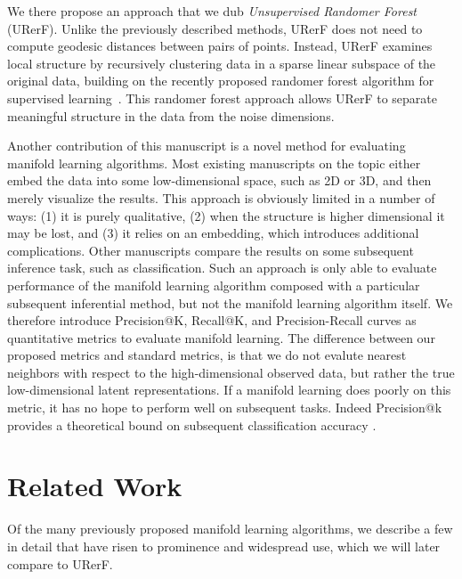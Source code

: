 We there propose an approach that we dub \emph{Unsupervised Randomer Forest} (URerF).
Unlike the previously described methods,
URerF does not need to compute geodesic distances
between pairs of points. Instead,
URerF examines local structure by 
recursively 
 clustering data in a sparse linear subspace of the original data, building on the recently proposed randomer forest algorithm for supervised learning~\cite{tomita2015randomer}.
This randomer forest approach allows URerF
to separate meaningful structure in the
data from the noise dimensions.

Another contribution of this manuscript is a novel method for evaluating manifold learning algorithms.  Most existing manuscripts on the topic either embed the data into some low-dimensional space, such as 2D or 3D, and then merely visualize the results.  This approach is obviously limited in a number of ways: (1) it is purely qualitative, (2) when the structure is higher dimensional it may be lost, and (3) it relies on an embedding, which introduces additional complications.  Other manuscripts compare the results on some subsequent inference task, such as classification.  Such an approach is only able to evaluate performance of the manifold learning algorithm composed with a particular subsequent inferential method, but not the manifold learning algorithm itself.  We therefore introduce Precision@K, Recall@K, and Precision-Recall curves as quantitative metrics to evaluate manifold learning.  The difference between our proposed metrics and standard metrics, is that we do not evalute nearest neighbors with respect to the high-dimensional observed data, but rather the true low-dimensional latent representations.  If a manifold learning does poorly on this metric, it has no hope to perform well on subsequent tasks. Indeed Precision@k provides a theoretical bound on subsequent classification accuracy \cite{Devroye1997-bd}. 


\section{Related Work}
Of the many previously proposed manifold learning algorithms, we describe a few in detail that have risen to prominence and widespread use, which we will later compare to URerF.
%
% 

